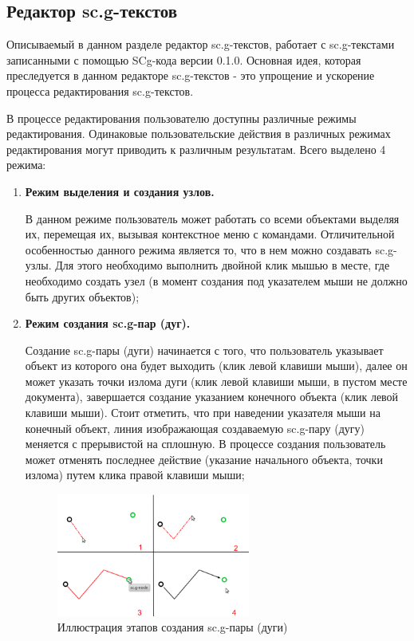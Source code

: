 
\subsection{Редактор sc.g-текстов}

Описываемый в данном разделе редактор sc.g-текстов, работает с sc.g-текстами записанными с помощью SCg-кода версии 0.1.0.
Основная идея, которая преследуется в данном редакторе sc.g-текстов - это упрощение и ускорение процесса редактирования sc.g-текстов.
 
В процессе редактирования пользователю доступны различные режимы редактирования. Одинаковые пользовательские действия в различных
режимах редактирования могут приводить к различным результатам. Всего выделено 4 режима:

\begin{enumerate}
 \item \textbf{Режим выделения и создания узлов.}
 
 В данном режиме пользователь может работать со всеми объектами выделяя их, перемещая их, вызывая контекстное меню с командами. 
 Отличительной особенностью данного режима является то, что в нем можно создавать {\sf sc.g-узлы}. 
 Для этого необходимо выполнить двойной клик мышью в месте, где необходимо создать узел 
 (в момент создания под указателем мыши не должно быть других объектов);
 \item \textbf{Режим создания sc.g-пар (дуг).} 
 
 Создание sc.g-пары (дуги) начинается с того, что пользователь указывает объект из которого она будет выходить (клик левой клавиши мыши), 
 далее он может указать точки излома дуги (клик левой клавиши мыши, в пустом месте документа), 
 завершается создание указанием конечного объекта (клик левой клавиши мыши). Стоит отметить, что при наведении указателя мыши
 на конечный объект, линия изображающая создаваемую sc.g-пару (дугу) меняется с прерывистой на сплошную.
 В процессе создания пользователь может отменять последнее действие (указание начального объекта, точки излома) путем клика правой клавиши мыши;
 \begin{figure}[H]
    \begin{center}
     	\includegraphics[width=0.6\textwidth]{../images/scg/scg-create-pair.png}
	\caption{Иллюстрация этапов создания sc.g-пары (дуги)}
	\label{scg_illustration_create_pair}
    \end{center}
 \end{figure}
 

\end{enumerate}
